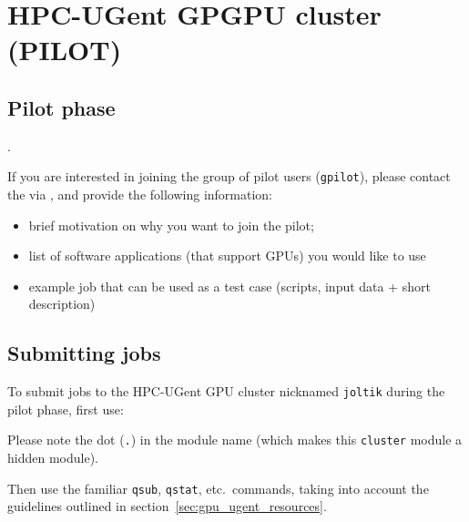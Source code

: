 \chapter{HPC-UGent GPGPU cluster (PILOT)}
\label{ch:gpu_ugent}


\section{Pilot phase}
\label{sec:gpu_ugent_pilot}

.

If you are interested in joining the group of pilot users (\lstinline|gpilot|),
please contact the \hpcTeam via \hpcinfo, and provide the following information:

\begin{itemize}
    \item brief motivation on why you want to join the pilot;
    \item list of software applications (that support GPUs) you would like to use
    \item example job that can be used as a test case (scripts, input data + short description)
\end{itemize}




\section{Submitting jobs}
\label{sec:gpu_ugent_jobs}

To submit jobs to the HPC-UGent GPU cluster nicknamed \lstinline|joltik| during the pilot phase, first use:

\begin{prompt}
\end{prompt}

Please note the dot (\lstinline|.|) in the module name (which makes this \lstinline|cluster| module a hidden module).

Then use the familiar \lstinline|qsub|, \lstinline|qstat|, etc.\ commands, taking into account the guidelines outlined
in section~\ref{sec:gpu_ugent_resources}.

